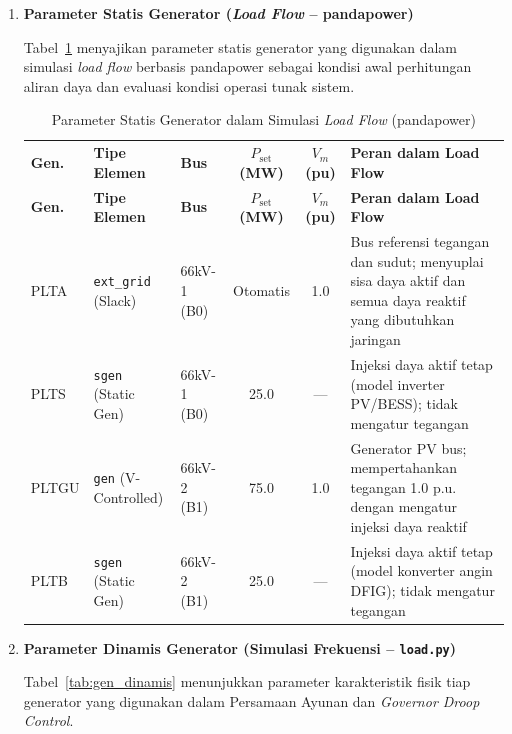 \begin{enumerate} 
\item[a.] \textbf{Parameter Statis Generator (\textit{Load Flow} -- pandapower)}

Tabel~\ref{tab:gen_statis} menyajikan parameter statis generator yang digunakan dalam simulasi \textit{load flow} berbasis pandapower sebagai kondisi awal perhitungan aliran daya dan evaluasi kondisi operasi tunak sistem.

\begin{longtable}{|l|p{3.0cm}|p{2.4cm}|c|c|p{5.0cm}|}
    \caption{Parameter Statis Generator dalam Simulasi \textit{Load Flow} (pandapower)}
    \label{tab:gen_statis}
    \vspace{-0.75em}\\
    \hline
    \textbf{Gen.} & \textbf{Tipe Elemen} & \textbf{Bus} &
    \textbf{$P_{\mathrm{set}}$ (MW)} & \textbf{$V_m$ (pu)} & \textbf{Peran dalam Load Flow} \\ \hline
    \endfirsthead
    \hline
    \textbf{Gen.} & \textbf{Tipe Elemen} & \textbf{Bus} &
    \textbf{$P_{\mathrm{set}}$ (MW)} & \textbf{$V_m$ (pu)} & \textbf{Peran dalam Load Flow} \\ \hline
    \endhead
    PLTA  & \texttt{ext\_grid} (Slack) & 66kV-1 (B0) & Otomatis & 1.0 &
        Bus referensi tegangan dan sudut; menyuplai sisa daya aktif dan semua daya reaktif yang dibutuhkan jaringan \\ \hline
    PLTS  & \texttt{sgen} (Static Gen) & 66kV-1 (B0) & 25.0 & --- &
        Injeksi daya aktif tetap (model inverter PV/BESS); tidak mengatur tegangan \\ \hline
    PLTGU & \texttt{gen} (V-Controlled) & 66kV-2 (B1) & 75.0 & 1.0 &
        Generator PV bus; mempertahankan tegangan 1.0 p.u. dengan mengatur injeksi daya reaktif \\ \hline
    PLTB  & \texttt{sgen} (Static Gen) & 66kV-2 (B1) & 25.0 & --- &
        Injeksi daya aktif tetap (model konverter angin DFIG); tidak mengatur tegangan \\ \hline
\end{longtable}

\item[b.] \textbf{Parameter Dinamis Generator (Simulasi Frekuensi -- \texttt{load.py})}

Tabel~\ref{tab:gen_dinamis} menunjukkan parameter karakteristik fisik tiap generator yang digunakan dalam Persamaan Ayunan dan \textit{Governor Droop Control}.


\end{enumerate}
